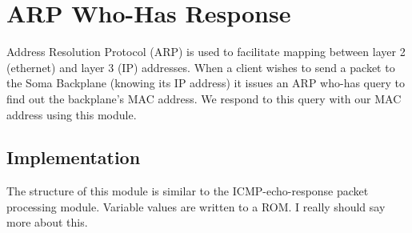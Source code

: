 \section{ARP Who-Has Response}

Address Resolution Protocol (ARP) is used to facilitate mapping
between layer 2 (ethernet) and layer 3 (IP) addresses. When a client
wishes to send a packet to the Soma Backplane (knowing its IP address)
it issues an ARP who-has query to find out the backplane's MAC
address. We respond to this query with our MAC address using this
module.

\subsection{Implementation}

The structure of this module is similar to the ICMP-echo-response
packet processing module. Variable values are written to a ROM. I
really should say more about this.
